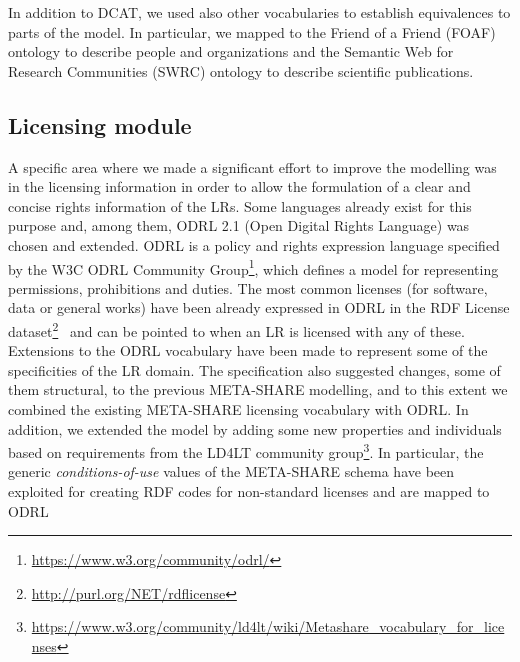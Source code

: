 \documentclass{llncs}
\begin{document}
In addition to DCAT, we used also other vocabularies to establish equivalences to parts of the model. In particular, we mapped to the Friend of
a Friend (FOAF) ontology to describe people and organizations and the Semantic
Web for Research Communities (SWRC) ontology to describe scientific
publications.

\subsection{Licensing module}
\label{sec:licensing}

A specific area where we made a significant effort to improve the modelling was
in the licensing information in order to allow the formulation of a clear and
concise rights information of the LRs. 
Some languages already exist for this purpose and, among them, ODRL 2.1 (Open Digital Rights Language) was
chosen and extended. ODRL is a policy and rights
expression language specified by the W3C ODRL Community
Group\footnote{\url{https://www.w3.org/community/odrl/}}, which defines a model
for representing permissions, prohibitions and duties.
The most common licenses (for software, data or general works) have been already
expressed in ODRL in the RDF License dataset\footnote{\url{http://purl.org/NET/rdflicense}}~\cite{rdflicense} and can be pointed to when an LR is licensed with any of these.
Extensions to the ODRL vocabulary have been made to represent some of the specificities
of the LR domain. The specification also suggested changes, some of them
structural, to the previous META-SHARE modelling, and to this extent we
combined the existing META-SHARE licensing vocabulary with ODRL.
In addition, we extended the model by adding some new properties and individuals
based on requirements from the LD4LT community group\footnote{\url{https://www.w3.org/community/ld4lt/wiki/Metashare\_vocabulary\_for\_licenses}}.
In particular, the generic \textit{conditions-of-use} values of the META-SHARE schema have been exploited for
creating RDF codes for non-standard licenses and are mapped to ODRL
\end{document}
